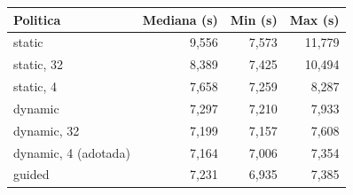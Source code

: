 \documentclass[10pt,a4paper]{article}
\begin{document}
\begin{center}
  \small
  \label{tab:sched}
  \begin{tabular}{l r r r}
    \toprule
    Politica & Mediana (s) & Min (s) & Max (s) \\
    \midrule
    static               & 9{,}556 & 7{,}573 & 11{,}779 \\
    static, 32           & 8{,}389 & 7{,}425 & 10{,}494 \\
    static, 4            & 7{,}658 & 7{,}259 &  8{,}287 \\
    dynamic              & 7{,}297 & 7{,}210 &  7{,}933 \\
    dynamic, 32          & 7{,}199 & 7{,}157 &  7{,}608 \\
    dynamic, 4 (adotada) & 7{,}164 & 7{,}006 &  7{,}354 \\
    guided               & 7{,}231 & 6{,}935 &  7{,}385 \\
    \bottomrule
  \end{tabular}
\end{center}
\end{document}

